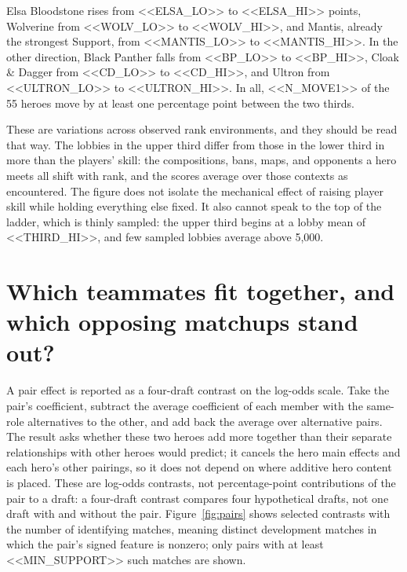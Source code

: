\documentclass[11pt]{article}
\begin{document}
Elsa Bloodstone rises from <<ELSA_LO>> to <<ELSA_HI>> points, Wolverine from <<WOLV_LO>> to <<WOLV_HI>>,
and Mantis, already the strongest Support, from <<MANTIS_LO>> to <<MANTIS_HI>>. In the other direction,
Black Panther falls from <<BP_LO>> to <<BP_HI>>, Cloak \& Dagger from <<CD_LO>> to <<CD_HI>>, and Ultron
from <<ULTRON_LO>> to <<ULTRON_HI>>. In all, <<N_MOVE1>> of the 55 heroes move by at least one percentage
point between the two thirds.

These are variations across observed rank environments, and they should be read that way. The lobbies in
the upper third differ from those in the lower third in more than the players' skill: the compositions,
bans, maps, and opponents a hero meets all shift with rank, and the scores average over those contexts as
encountered. The figure does not isolate the mechanical effect of raising player skill while holding
everything else fixed. It also cannot speak to the top of the ladder, which is thinly sampled: the upper
third begins at a lobby mean of <<THIRD_HI>>, and few sampled lobbies average above 5{,}000.

\section*{Which teammates fit together, and which opposing matchups stand out?}

A pair effect is reported as a four-draft contrast on the log-odds scale. Take the pair's coefficient,
subtract the average coefficient of each member with the same-role alternatives to the other, and add back
the average over alternative pairs. The result asks whether these two heroes add more together than their
separate relationships with other heroes would predict; it cancels the hero main effects and each hero's
other pairings, so it does not depend on where additive hero content is placed. These are log-odds
contrasts, not percentage-point contributions of the pair to a draft: a four-draft contrast compares
four hypothetical drafts, not one draft with and without the pair. Figure~\ref{fig:pairs} shows selected
contrasts with the number of identifying matches, meaning distinct development matches in which the
pair's signed feature is nonzero; only pairs with at least <<MIN_SUPPORT>> such matches are shown.
\end{document}

